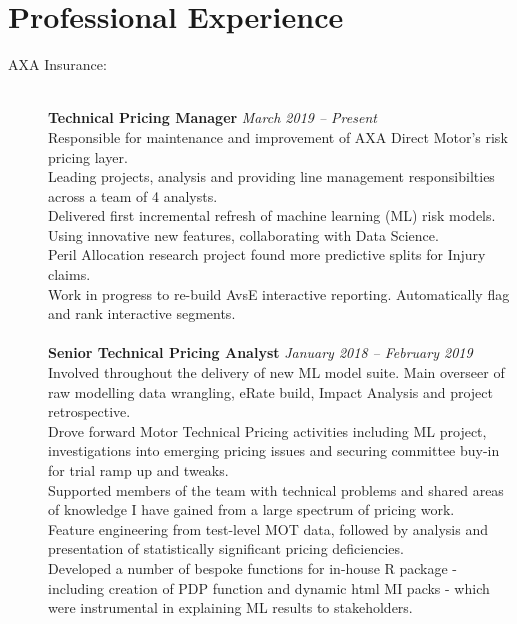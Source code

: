 \documentclass[11pt]{article}
\begin{document}
\section*{Professional Experience}
\begin{description}

\item[AXA Insurance:] \hspace{1mm} \\
\textbf{Technical Pricing Manager} \emph{March 2019 -- Present}\\
\textbullet \quad Responsible for maintenance and improvement of AXA Direct Motor's risk pricing layer.\\
\textbullet \quad Leading projects, analysis and providing line management responsibilties across a team of 4 analysts.\\
\textbullet \quad Delivered first incremental refresh of machine learning (ML) risk models. Using innovative new features, collaborating with Data Science.\\
\textbullet \quad Peril Allocation research project found more predictive splits for Injury claims.\\
\textbullet \quad Work in progress to re-build AvsE interactive reporting. Automatically flag and rank interactive segments.
\\\\
\textbf{Senior Technical Pricing Analyst} \emph{January 2018 -- February 2019}\\
\textbullet \quad Involved throughout the delivery of new ML model suite. Main overseer of raw modelling data wrangling, eRate build, Impact Analysis and project retrospective. \\
\textbullet \quad Drove forward Motor Technical Pricing activities including ML project, investigations into emerging pricing issues and securing committee buy-in for trial ramp up and tweaks. \\
\textbullet \quad Supported members of the team with technical problems and shared areas of knowledge I have gained from a large spectrum of pricing work. \\
\textbullet \quad Feature engineering from test-level MOT data, followed by analysis and presentation of statistically significant pricing deficiencies. \\
\textbullet \quad Developed a number of bespoke functions for in-house R package - including creation of PDP function and dynamic html MI packs - which were instrumental in explaining ML results to stakeholders. \\

\end{description}
\end{document}

